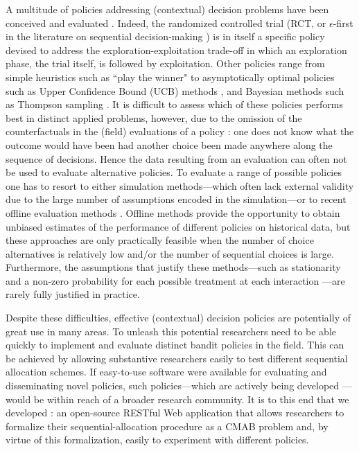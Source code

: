 \documentclass[nojss]{jss}
\begin{document}
A multitude of policies addressing (contextual) decision problems have been conceived and evaluated \citep[see,  e.g.,][]{berry1985bandit, Chapelle2011, Dudik2011a}. Indeed, the randomized controlled trial (RCT, or $\epsilon$-first in the literature on sequential decision-making \citep{Chapelle2011}) is in itself a specific policy devised to address the exploration-exploitation trade-off in which an exploration phase, the trial itself, is followed by exploitation. Other policies range from simple heuristics such as ``play the winner"  \citep{Lachin1988,  Villar2015} to asymptotically optimal policies such as Upper Confidence Bound (UCB) methods \citep{Auer2010, Garivier2011, Audibert2009}, and Bayesian methods such as Thompson sampling \citep{thompson1933likelihood, Chapelle2011, Agrawal2011}. It is difficult to assess which of these policies performs best in distinct applied problems, however, due to the omission of the counterfactuals in the (field) evaluations of a policy \citep{Li2010a}: one does not know what the outcome would have been had another choice been made anywhere along the sequence of decisions. Hence the data resulting from an evaluation can often not be used to evaluate alternative policies. To evaluate a range of possible policies one has to resort to either simulation methods---which often lack external validity due to the large number of assumptions encoded in the simulation---or to recent offline evaluation methods \citep{Li2010a, agarwal2016making}. Offline methods provide the opportunity to obtain unbiased estimates of the performance of different policies on historical data, but these approaches are only practically feasible when the number of choice alternatives is relatively low and/or the number of sequential choices is large. Furthermore, the assumptions that justify these methods---such as stationarity and a non-zero probability for each possible treatment at each interaction \citep{Li2010a}---are rarely fully justified in practice.

Despite these difficulties, effective (contextual) decision policies are potentially of great use in many areas. To unleash this potential researchers need to be able quickly to implement and evaluate distinct bandit policies in the field. This can be achieved by allowing substantive researchers easily to test different sequential allocation schemes. If easy-to-use software were available for evaluating and disseminating novel policies, such policies---which are actively being developed \citep[e.g.,][]{Kaptein, Osband2015, bastani2015online}---would be within reach of a broader research community. It is to this end that we developed : an open-source RESTful Web application that allows researchers to formalize their sequential-allocation procedure as a CMAB problem and, by virtue of this formalization, easily to experiment with different policies.  
\end{document}
